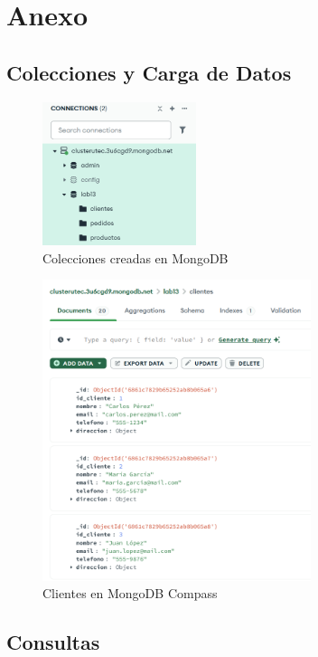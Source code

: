 \section{Anexo}

\subsection{Colecciones y Carga de Datos}
\begin{figure}[H]
    \centering
    \includegraphics[width=0.4\textwidth]{./p1_collections.png}
    \caption{Colecciones creadas en MongoDB}\label{fig:collections}
\end{figure}

\begin{figure}[H]
    \centering
    \includegraphics[width=0.7\textwidth]{./p1_clientes.png}
    \caption{Clientes en MongoDB Compass}\label{fig:clientes}
\end{figure}

\newpage
\subsection{Consultas}\label{consultas}

